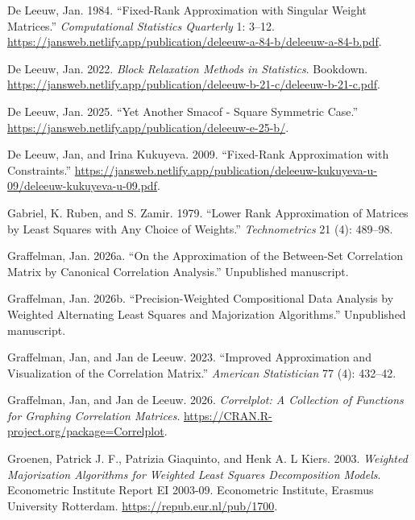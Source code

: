 \documentclass[
  12pt,
  letterpaper,
  DIV=11,
  numbers=noendperiod]{scrartcl}
\newlength{\cslhangindent}
\newenvironment{CSLReferences}[2] %
 {\begin{list}{}{%
  \setlength{\itemindent}{0pt}
  \setlength{\leftmargin}{0pt}
  \setlength{\parsep}{0pt}
  \ifodd #1
   \setlength{\leftmargin}{\cslhangindent}
   \setlength{\itemindent}{-1\cslhangindent}
  \fi
  \setlength{\itemsep}{#2\baselineskip}}}
 {\end{list}}
\begin{document}
\protect{}\label{refs}
\begin{CSLReferences}{1}{1}
De Leeuw, Jan. 1984. {``Fixed-Rank Approximation with Singular Weight
Matrices.''} \emph{Computational Statistics Quarterly} 1: 3--12.
\url{https://jansweb.netlify.app/publication/deleeuw-a-84-b/deleeuw-a-84-b.pdf}.

De Leeuw, Jan. 2022. \emph{Block Relaxation Methods in Statistics}.
Bookdown.
\url{https://jansweb.netlify.app/publication/deleeuw-b-21-c/deleeuw-b-21-c.pdf}.

De Leeuw, Jan. 2025. {``Yet Another Smacof - Square Symmetric Case.''}
\url{https://jansweb.netlify.app/publication/deleeuw-e-25-b/}.

De Leeuw, Jan, and Irina Kukuyeva. 2009. {``{Fixed-Rank Approximation
with Constraints}.''}
\url{https://jansweb.netlify.app/publication/deleeuw-kukuyeva-u-09/deleeuw-kukuyeva-u-09.pdf}.

Gabriel, K. Ruben, and S. Zamir. 1979. {``{Lower Rank Approximation of
Matrices by Least Squares with Any Choice of Weights}.''}
\emph{Technometrics} 21 (4): 489--98.

Graffelman, Jan. 2026a. {``On the Approximation of the Between-Set
Correlation Matrix by Canonical Correlation Analysis.''} Unpublished
manuscript.

Graffelman, Jan. 2026b. {``Precision-Weighted Compositional Data
Analysis by Weighted Alternating Least Squares and Majorization
Algorithms.''} Unpublished manuscript.

{Graffelman, Jan, and Jan de Leeuw}. 2023. {``Improved Approximation and
Visualization of the Correlation Matrix.''} \emph{American Statistician}
77 (4): 432--42.

{Graffelman, Jan, and Jan de Leeuw}. 2026. \emph{{Correlplot: A
Collection of Functions for Graphing Correlation Matrices}}.
\url{https://CRAN.R-project.org/package=Correlplot}.

Groenen, Patrick J. F., Patrizia Giaquinto, and Henk A. L Kiers. 2003.
\emph{{Weighted Majorization Algorithms for Weighted Least Squares
Decomposition Models}}. Econometric Institute Report EI 2003-09.
Econometric Institute, Erasmus University Rotterdam.
\url{https://repub.eur.nl/pub/1700}.


\end{CSLReferences}
\end{document}
